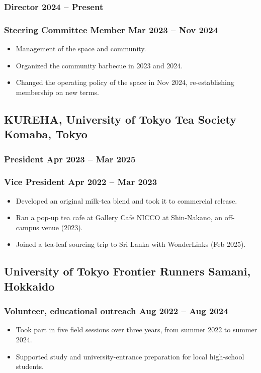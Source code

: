 \documentclass[11pt]{article} %
\begin{document}
\subsubsection{Director \hfill 2024 -- Present} %
\subsubsection{Steering Committee Member \hfill Mar 2023 -- Nov 2024}
\begin{itemize}
	\item Management of the space and community.
	\item Organized the community barbecue in 2023 and 2024.
	\item Changed the operating policy of the space in Nov 2024, re-establishing membership on new terms.
\end{itemize}

\subsection{KUREHA, University of Tokyo Tea Society \hfill Komaba, Tokyo}
\subsubsection{President \hfill Apr 2023 -- Mar 2025}
\subsubsection{Vice President \hfill Apr 2022 -- Mar 2023}
\begin{itemize}
	\item Developed an original milk-tea blend and took it to commercial release.
	\item Ran a pop-up tea cafe at Gallery Cafe NICCO at Shin-Nakano, an off-campus venue (2023).
	\item Joined a tea-leaf sourcing trip to Sri Lanka with WonderLinks (Feb 2025).
\end{itemize}

\subsection{University of Tokyo Frontier Runners \hfill Samani, Hokkaido}
\subsubsection{Volunteer, educational outreach \hfill Aug 2022 -- Aug 2024}
\begin{itemize}
	\item Took part in five field sessions over three years, from summer 2022 to summer 2024.
	\item Supported study and university-entrance preparation for local high-school students.
\end{itemize}
\end{document}
